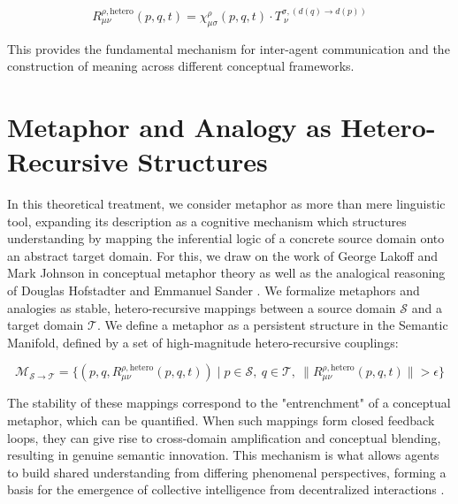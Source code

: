 \begin{equation}
R^{\rho, \text{hetero}}_{\mu\nu}(p, q, t) = \chi^\rho_{\mu\sigma}(p, q, t) \cdot T_{\ \nu}^{\sigma, (d(q) \to d(p))}
\end{equation}

This provides the fundamental mechanism for inter-agent communication and the construction of meaning across different conceptual frameworks.


\section{Metaphor and Analogy as Hetero-Recursive Structures}
\label{14.2:metaphor_and_analogy_as_hetero_recursive_structures}

In this theoretical treatment, we consider metaphor as more than mere linguistic tool, expanding its description as a cognitive mechanism which structures understanding by mapping the inferential logic of a concrete source domain onto an abstract target domain. For this, we draw on the work of George Lakoff and Mark Johnson in conceptual metaphor theory \autocite{LakoffJohnson1980} as well as the analogical reasoning of Douglas Hofstadter and Emmanuel Sander \autocite{HofstadterSander2013}. We formalize metaphors and analogies as stable, hetero-recursive mappings between a source domain \(\mathcal{S}\) and a target domain \(\mathcal{T}\). We define a metaphor as a persistent structure in the Semantic Manifold, defined by a set of high-magnitude hetero-recursive couplings:

\begin{equation}
\mathcal{M}_{\mathcal{S} \to \mathcal{T}} = \{(p, q, R^{\rho, \text{hetero}}_{\mu\nu}(p, q, t)) \mid p \in \mathcal{S},\ q \in \mathcal{T},\ \|R^{\rho, \text{hetero}}_{\mu\nu}(p, q, t)\| > \epsilon\}
\end{equation}

The stability of these mappings correspond to the "entrenchment" of a conceptual metaphor, which can be quantified. When such mappings form closed feedback loops, they can give rise to cross-domain amplification and conceptual blending, resulting in genuine semantic innovation. This mechanism is what allows agents to build shared understanding from differing phenomenal perspectives, forming a basis for the emergence of collective intelligence from decentralized interactions \autocite{Surowiecki2004}.

